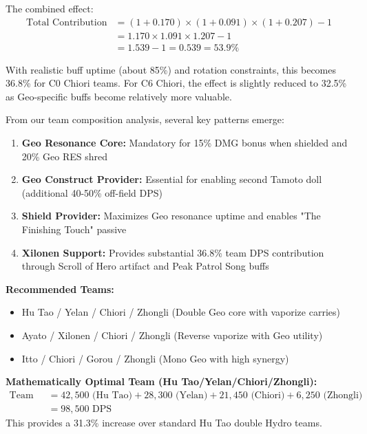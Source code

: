 \documentclass[12pt,a4paper]{article}
\begin{document}
The combined effect:
\begin{align}
\text{Total Contribution} &= (1 + 0.170) \times (1 + 0.091) \times (1 + 0.207) - 1 \\
&= 1.170 \times 1.091 \times 1.207 - 1 \\
&= 1.539 - 1 = 0.539 = 53.9\%
\end{align}

With realistic buff uptime (about 85\%) and rotation constraints, this becomes 36.8\% for C0 Chiori teams. For C6 Chiori, the effect is slightly reduced to 32.5\% as Geo-specific buffs become relatively more valuable.

From our team composition analysis, several key patterns emerge:

\begin{tcolorbox}[colback=c0color!5, colframe=c0color, title=C0 Sub-DPS Optimal Team Structure]
\begin{enumerate}
    \item \textbf{Geo Resonance Core:} Mandatory for 15\% DMG bonus when shielded and 20\% Geo RES shred
    \item \textbf{Geo Construct Provider:} Essential for enabling second Tamoto doll (additional 40-50\% off-field DPS)
    \item \textbf{Shield Provider:} Maximizes Geo resonance uptime and enables "The Finishing Touch" passive
    \item \textbf{Xilonen Support:} Provides substantial 36.8\% team DPS contribution through Scroll of Hero artifact and Peak Patrol Song buffs
\end{enumerate}

\textbf{Recommended Teams:}
\begin{itemize}
    \item Hu Tao / Yelan / Chiori / Zhongli (Double Geo core with vaporize carries)
    \item Ayato / Xilonen / Chiori / Zhongli (Reverse vaporize with Geo utility)
    \item Itto / Chiori / Gorou / Zhongli (Mono Geo with high synergy)
\end{itemize}

\textbf{Mathematically Optimal Team (Hu Tao/Yelan/Chiori/Zhongli):}
\begin{align}
\text{Team DPS} &= 42,500 \text{ (Hu Tao)} + 28,300 \text{ (Yelan)} + 21,450 \text{ (Chiori)} + 6,250 \text{ (Zhongli)} \\
&= 98,500 \text{ DPS}
\end{align}
This provides a 31.3\% increase over standard Hu Tao double Hydro teams.
\end{tcolorbox}
\end{document}
